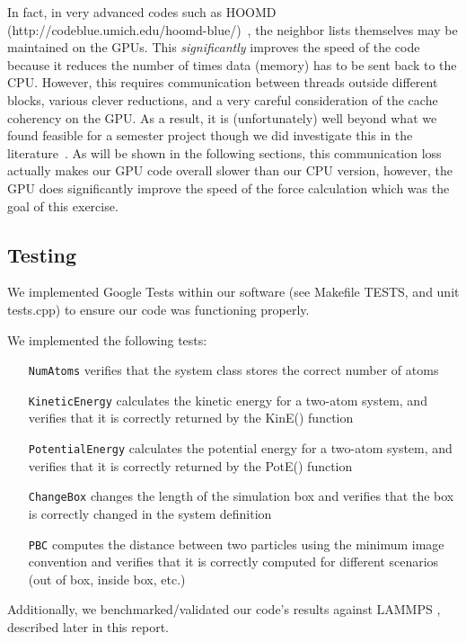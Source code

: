 \documentclass[12pt]{article}
\begin{document}
In fact, in very advanced codes such as HOOMD (http://codeblue.umich.edu/hoomd-blue/)~\cite{Anderson2008}, the neighbor lists themselves may be maintained on the GPUs.  This \emph{significantly} improves the speed of the code because it reduces the number of times data (memory) has to be sent back to the CPU.   However, this requires communication between threads outside different blocks, various clever reductions, and a very careful consideration of the cache coherency on the GPU.  As a result, it is (unfortunately) well beyond what we found feasible for a semester project though we did investigate this in the literature~\cite{Lipscomb2012}.  As will be shown in the following sections, this communication loss actually makes our GPU code overall slower than our CPU version, however, the GPU does significantly improve the speed of the force calculation which was the goal of this exercise.

\subsection{Testing}

We implemented Google Tests within our software (see Makefile TESTS, and unit tests.cpp) to ensure our code was functioning properly.

We implemented the following tests:
	\begin{itemize}
	\item[\texttt{NumAtoms}] verifies that the system class stores the correct number of atoms
	\item[\texttt{KineticEnergy}] calculates the kinetic energy for a two-atom system, and verifies that it is correctly returned by the KinE() function
	\item[\texttt{PotentialEnergy}] calculates the potential energy for a two-atom system, and verifies that it is correctly returned by the PotE() function
	\item[\texttt{ChangeBox}] changes the length of the simulation box and verifies that the box is correctly changed in the system definition
	\item[\texttt{PBC}] computes the distance between two particles using the minimum image convention and verifies that it is correctly computed for different scenarios (out of box, inside box, etc.)
	\end{itemize}

Additionally, we benchmarked/validated our code's results against LAMMPS \cite{Plimpton1995}, described later in this report.
\end{document}
